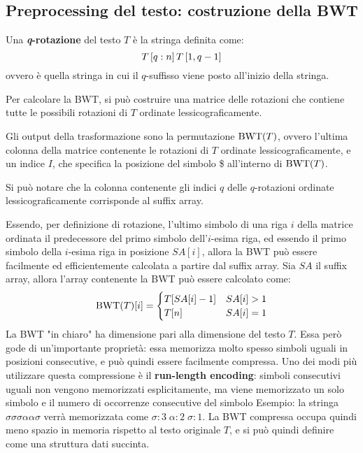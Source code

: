 \subsection{Preprocessing del testo: costruzione della BWT}
\begin{defn}
    Una \textbf{\textit{q}-rotazione} del testo $T$ è la stringa definita come:
    \[
        T\left[q:n\right]T\left[1, q-1\right]
    \]
    ovvero è quella stringa in cui il $q$-suffisso viene posto all'inizio della stringa.
\end{defn}
Per calcolare la BWT, si può costruire una matrice delle rotazioni che contiene tutte le possibili rotazioni di $T$ ordinate lessicograficamente.
\begin{defn}
    Gli output della trasformazione sono la permutazione $\textnormal{BWT}(T)$, ovvero l'ultima colonna della matrice contenente le rotazioni di $T$ ordinate lessicograficamente, e un indice $I$, che specifica la posizione del simbolo \$ all'interno di $\textnormal{BWT}(T)$.
\end{defn}
\begin{rem}
    Si può notare che la colonna contenente gli indici $q$ delle $q$-rotazioni ordinate lessicograficamente corrisponde al suffix array.
\end{rem}
Essendo, per definizione di rotazione, l'ultimo simbolo di una riga $i$ della matrice ordinata il predecessore del primo simbolo dell'$i$-esima riga, ed essendo il primo simbolo della $i$-esima riga in posizione $SA[i]$, allora la BWT può essere facilmente ed efficientemente calcolata a partire dal suffix array. Sia $SA$ il suffix array, allora l'array contenente la BWT può essere calcolato come:
\[
    \textnormal{BWT}(T)[i] = \begin{cases}
        T[SA[i]-1] & SA[i] > 1 \\
        T[n] & SA[i] = 1
    \end{cases}
\]
La BWT "in chiaro" ha dimensione pari alla dimensione del testo $T$. Essa però gode di un'importante proprietà: essa memorizza molto spesso simboli uguali in posizioni consecutive, e può quindi essere facilmente compressa. Uno dei modi più utilizzare questa compressione è il \textbf{run-length encoding}: simboli consecutivi uguali non vengono memorizzati esplicitamente, ma viene memorizzato un solo simbolo e il numero di occorrenze consecutive del simbolo 
Esempio: la stringa $\sigma \sigma \sigma \alpha \alpha \sigma$ verrà memorizzata come $\sigma : 3 \; \alpha : 2 \; \sigma : 1$.
La BWT compressa occupa quindi meno spazio in memoria rispetto al testo originale $T$, e si può quindi definire come una struttura dati succinta.

